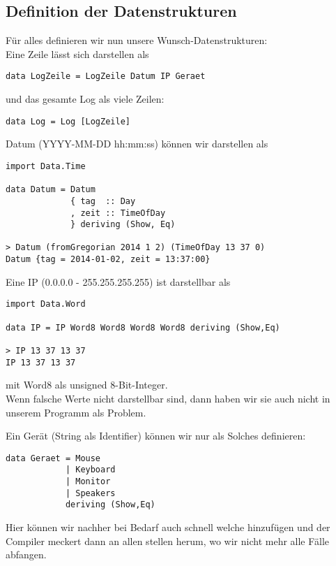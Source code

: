 \documentclass{beamer}
\begin{document}
\subsection{Definition der Datenstrukturen}
\begin{frame}[fragile]
Für alles definieren wir nun unsere Wunsch-Datenstrukturen:\\\pause
\bigskip
Eine Zeile lässt sich darstellen als
\begin{verbatim}
data LogZeile = LogZeile Datum IP Geraet
\end{verbatim}
und das gesamte Log als viele Zeilen:
\begin{verbatim}
data Log = Log [LogZeile]
\end{verbatim}
\end{frame}

\begin{frame}[fragile]
Datum (YYYY-MM-DD hh:mm:ss) können wir darstellen als
\begin{verbatim}
import Data.Time

data Datum = Datum
             { tag  :: Day
             , zeit :: TimeOfDay
             } deriving (Show, Eq)

> Datum (fromGregorian 2014 1 2) (TimeOfDay 13 37 0)
Datum {tag = 2014-01-02, zeit = 13:37:00}
\end{verbatim}

\end{frame}

\begin{frame}[fragile]
Eine IP (0.0.0.0 - 255.255.255.255) ist darstellbar als
\begin{verbatim}
import Data.Word

data IP = IP Word8 Word8 Word8 Word8 deriving (Show,Eq)

> IP 13 37 13 37
IP 13 37 13 37
\end{verbatim}
mit Word8 als unsigned 8-Bit-Integer.\\
\pause
Wenn falsche Werte nicht darstellbar sind, dann haben wir sie auch nicht in unserem Programm als Problem.
\end{frame}

\begin{frame}[fragile]
Ein Gerät (String als Identifier) können wir nur als Solches definieren:
\begin{verbatim}
data Geraet = Mouse 
            | Keyboard 
            | Monitor 
            | Speakers 
            deriving (Show,Eq)
\end{verbatim}
\pause
Hier können wir nachher bei Bedarf auch schnell welche hinzufügen und der Compiler meckert dann an allen stellen herum, wo wir nicht mehr alle Fälle abfangen.
\end{frame}
\end{document}
